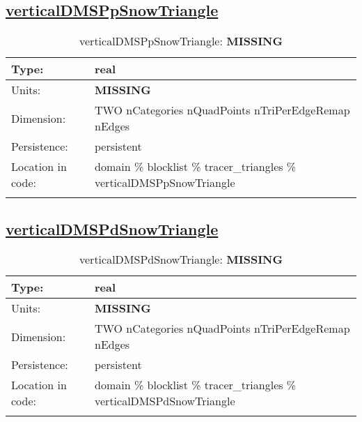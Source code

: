 \subsection[verticalDMSPpSnowTriangle]{\hyperref[sec:var_tab_tracer_triangles]{verticalDMSPpSnowTriangle}}
\label{subsec:var_sec_tracer_triangles_verticalDMSPpSnowTriangle}
\begin{center}
\begin{longtable}{| p{2.0in} | p{4.0in} |}
        \hline 
        Type: & real \\
        \hline 
        Units: & {\bf \color{red} MISSING} \\
        \hline 
        Dimension: & TWO nCategories nQuadPoints nTriPerEdgeRemap nEdges \\
        \hline 
        Persistence: & persistent \\
        \hline 
         Location in code: & domain \% blocklist \% tracer\_triangles \% verticalDMSPpSnowTriangle \\
         \hline 
    \caption{verticalDMSPpSnowTriangle: {\bf \color{red} MISSING}}
\end{longtable}
\end{center}
\subsection[verticalDMSPdSnowTriangle]{\hyperref[sec:var_tab_tracer_triangles]{verticalDMSPdSnowTriangle}}
\label{subsec:var_sec_tracer_triangles_verticalDMSPdSnowTriangle}
\begin{center}
\begin{longtable}{| p{2.0in} | p{4.0in} |}
        \hline 
        Type: & real \\
        \hline 
        Units: & {\bf \color{red} MISSING} \\
        \hline 
        Dimension: & TWO nCategories nQuadPoints nTriPerEdgeRemap nEdges \\
        \hline 
        Persistence: & persistent \\
        \hline 
         Location in code: & domain \% blocklist \% tracer\_triangles \% verticalDMSPdSnowTriangle \\
         \hline 
    \caption{verticalDMSPdSnowTriangle: {\bf \color{red} MISSING}}
\end{longtable}
\end{center}
